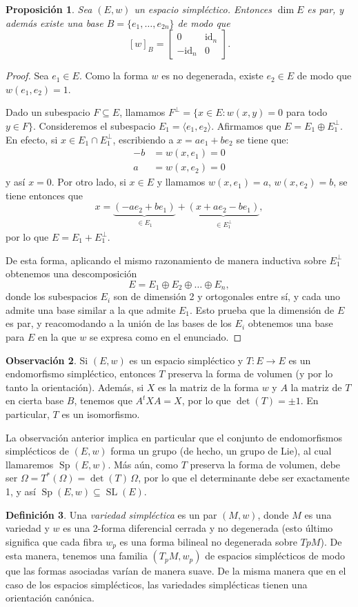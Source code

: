 \documentclass[11pt, a4paper]{article}
\newcommand{\id}{\mathrm{id}}
\DeclareMathOperator{\Sp}{Sp}
\DeclareMathOperator{\SL}{SL}
\theoremstyle{plain}
\newtheorem{prop}{Proposición}[section]
\theoremstyle{definition}
\newtheorem{defn}[prop]{Definición}
\newtheorem{obs}[prop]{Observación}
\begin{document}
\begin{prop} Sea $(E,w)$ un espacio simpléctico. Entonces $\dim E$ es par, y además existe una base $B=\{e_1,\dots,e_{2n}\}$ de modo que
\[[w]_B=\begin{bmatrix}
    0 &\id_n\\
    -\id_n & 0
\end{bmatrix}.\]
\end{prop}
\begin{proof} Sea $e_1\in E$. Como la forma $w$ es no degenerada, existe $e_2\in E$ de modo que $w(e_1,e_2)=1$.

Dado un subespacio $F\subseteq E$, llamamos $F^\perp = \{x\in E : w(x,y)=0$ para todo $y\in F\}$. Consideremos el subespacio $E_1 = \langle e_1, e_2\rangle$. Afirmamos que $E = E_1\oplus E_1^\perp$. En efecto, si $x\in E_1\cap E_1^\perp$, escribiendo a $x=a e_1 + b e_2$ se tiene que:
\begin{align*}
-b&=w(x,e_1)=0\\
a&=w(x,e_2) =0
\end{align*}
y así $x=0$. Por otro lado, si $x\in E$ y llamamos $w(x,e_1)=a$, $w(x,e_2)=b$, se tiene entonces que
\[ x = \underbrace{(-ae_2 + be_1)}_{\substack{\in E_1}} + \underbrace{(x+ae_2-be_1)}_{\substack{\in E_1^\perp}},\]
por lo que $E=E_1+E_1^\perp$.

De esta forma, aplicando el mismo razonamiento de manera inductiva sobre $E_1^\perp$ obtenemos una descomposición
\[E=E_1\oplus E_2 \oplus\dots\oplus E_n,\]
donde los subespacios $E_i$ son de dimensión 2 y ortogonales entre sí, y cada uno admite una base similar a la que admite $E_1$. Esto prueba que la dimensión de $E$ es par, y reacomodando a la unión de las bases de los $E_i$ obtenemos una base para $E$ en la que $w$ se expresa como en el enunciado.
\end{proof}
\begin{obs} Si $(E,w)$ es un espacio simpléctico y $T:E\to E$ es un endomorfismo simpléctico, entonces $T$ preserva la forma de volumen (y por lo tanto la orientación). Además, si $X$ es la matriz de la forma $w$ y $A$ la matriz de $T$ en cierta base $B$, tenemos que $A^tXA=X$, por lo que $\det(T)=\pm 1$. En particular, $T$ es un isomorfismo.
\end{obs}
La observación anterior implica en particular que el conjunto de endomorfismos simplécticos de $(E,w)$ forma un grupo (de hecho, un grupo de Lie), al cual llamaremos $\Sp(E,w)$. Más aún, como $T$ preserva la forma de volumen, debe ser $\Omega=T^*(\Omega) = \det(T)\,\Omega$, por lo que el determinante debe ser exactamente 1, y así $\Sp(E,w)\subseteq \SL(E)$.
\begin{defn} Una \emph{variedad simpléctica} es un par $(M,w)$, donde $M$ es una variedad y $w$ es una 2-forma diferencial cerrada y no degenerada (esto último significa que cada fibra $w_p$ es una forma bilineal no degenerada sobre $TpM$). De esta manera, tenemos una familia $(T_pM, w_p)$ de espacios simplécticos de modo que las formas asociadas varían de manera suave. De la misma manera que en el caso de los espacios simplécticos, las variedades simplécticas tienen una orientación canónica.
\end{defn}
\end{document}
